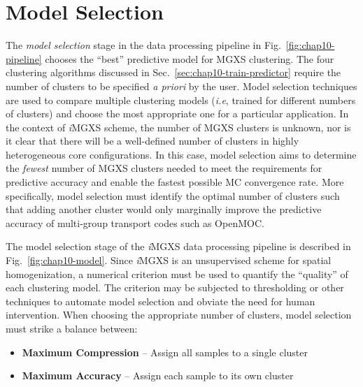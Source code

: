 \section{Model Selection}
\label{sec:chap10-model-select}

The \textit{model selection} stage in the data processing pipeline in Fig.~\ref{fig:chap10-pipeline} chooses the ``best'' predictive model for \ac{MGXS} clustering. The four clustering algorithms discussed in Sec.~\ref{sec:chap10-train-predictor} require the number of clusters to be specified \textit{a priori} by the user. Model selection techniques are used to compare multiple clustering models (\textit{i.e}, trained for different numbers of clusters) and choose the most appropriate one for a particular application. In the context of \textit{i}\ac{MGXS} scheme, the number of \ac{MGXS} clusters is unknown, nor is it clear that there will be a well-defined number of clusters in highly heterogeneous core configurations. In this case, model selection aims to determine the \textit{fewest} number of \ac{MGXS} clusters needed to meet the requirements for predictive accuracy and enable the fastest possible \ac{MC} convergence rate. More specifically, model selection must identify the optimal number of clusters such that adding another cluster would only marginally improve the predictive accuracy of multi-group transport codes such as OpenMOC. 

The model selection stage of the \textit{i}\ac{MGXS} data processing pipeline is described in Fig.~\ref{fig:chap10-model}. Since \textit{i}\ac{MGXS} is an unsupervised scheme for spatial homogenization, a numerical criterion must be used to quantify the ``quality'' of each clustering model. The criterion may be subjected to thresholding or other techniques to automate model selection and obviate the need for human intervention. When choosing the appropriate number of clusters, model selection must strike a balance between:

\begin{itemize}[noitemsep]
\item  \textbf{Maximum Compression} -- Assign all samples to a single cluster
\item \textbf{Maximum Accuracy} -- Assign each sample to its own cluster
\end{itemize}

